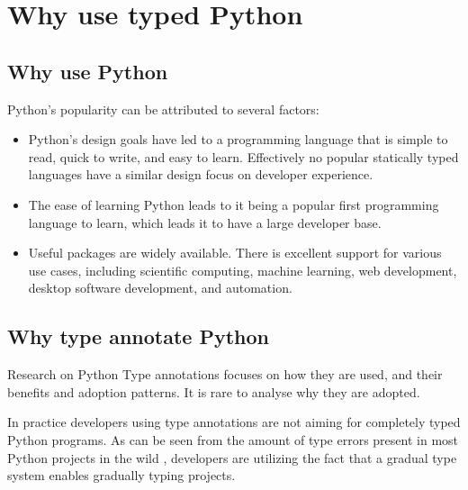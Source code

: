 \chapter{Why use typed Python\label{discussion}}  

\section{Why use Python}
Python's popularity can be attributed to several factors:

\begin{itemize}
    \item Python's design goals have led to a programming language that is simple to read, quick to write, and easy to learn. Effectively no popular statically typed languages have a similar design focus on developer experience.
    \item The ease of learning Python leads to it being a popular first programming language to learn, which leads it to have a large developer base.
    \item Useful packages are widely available. There is excellent support for various use cases, including scientific computing, machine learning, web development, desktop software development, and automation. 
\end{itemize}

\section{Why type annotate Python}

Research on Python Type annotations focuses on how they are used, and their benefits and adoption patterns. It is rare to analyse why they are adopted.

In practice developers using type annotations are not aiming for completely typed Python programs. As can be seen from the amount of type errors present in most Python projects in the wild \cite{di_grazia_evolution_2022, rak-amnouykit_taleoftwo_2020,}, developers are utilizing the fact that a gradual type system enables gradually typing projects.

